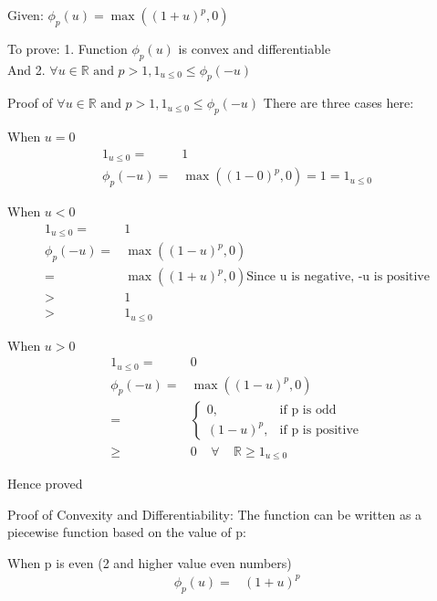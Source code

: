 \documentclass{article}
\begin{document}
\begin{description}
  \item{Given: } \( \phi_{p}(u) = \max( {(1 + u)}^{p}, 0) \)
  \item{To prove:} 1. Function \( \phi_{p}(u) \) is convex and differentiable \\ And 2. \( \forall u \in \mathbb{R} \textrm{ and } p > 1,  1_{u \le 0} \le \phi_{p}(-u) \)
  \item{Proof of \( \forall u \in \mathbb{R} \textrm{ and } p > 1,  1_{u \le 0} \le \phi_{p}(-u) \)}
    There are three cases here:
    
    When \( u = 0\)
    \begin{align*}
        1_{u \le 0} = &1 \\
        \phi_{p}(-u) = & \max( {(1 - 0)}^{p}, 0) = 1 = 1_{u \le 0}
    \end{align*}

    When \( u < 0\)
    \begin{align*}
        1_{u \le 0} = &1 \\
        \phi_{p}(-u) = & \max( {(1 - u)}^{p}, 0)  \\
        =& \max( {(1 + u)}^{p}, 0)  \textrm{Since u is negative, -u is positive} \\
        > & 1 \\
        > & 1_{u \le 0}
    \end{align*}

    When \( u > 0 \)
    \begin{align*}
        1_{u \le 0} = & 0 \\
        \phi_{p}(-u) = & \max( {(1 - u)}^{p}, 0)  \\
        = & 
        \begin{cases}
          0, & \textrm{if p is odd} \\
          {(1-u)}^p, & \textrm{if p is positive}
        \end{cases} \\
        \ge & 0 \;\;\;\; \forall \;\;\;\; \mathbb{R}
        \ge 1_{u \le 0}
    \end{align*}

    Hence proved
  \item{Proof of Convexity and Differentiability:}
    The function can be written as a piecewise function based on the value of p:

    When p is even (2 and higher value even numbers)
    \begin{align*}
        \phi_{p}(u) = & {(1+u)}^p \\
    \end{align*}


\end{description}
\end{document}
